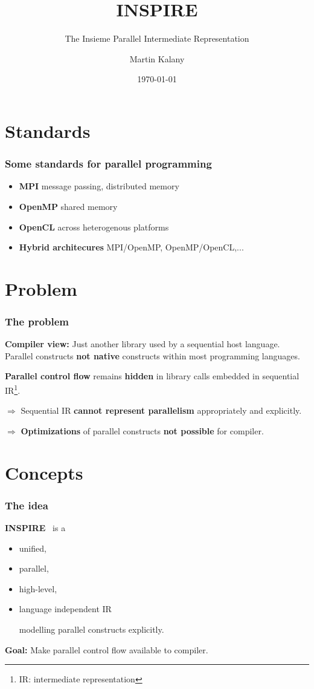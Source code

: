 \documentclass{beamer}
\title{INSPIRE}
\subtitle{The Insieme Parallel Intermediate Representation}
\author{Martin Kalany}
\institute
{
  Graduate student in Computer Science\\
  Vienna University of Technology\\
}
\date{\today}
\newcommand\fR[1]{\textcolor{red!80!black}{\textbf{#1}}}
\newcommand\fB[1]{\textcolor{blue!80!black}{\textbf{#1}}}
\newcommand\fG[1]{\textcolor{green!70!black}{\textbf{#1}}}
\begin{document}
\maketitle

\section{Standards}
\begin{frame}
\frametitle{Some standards for parallel programming}
\begin{itemize}
\item \fB{MPI} message passing, distributed memory
\item \fB{OpenMP} shared memory
\item \fB{OpenCL} across heterogenous platforms

\bigskip
\item \fB{Hybrid architecures} MPI/OpenMP, OpenMP/OpenCL,...
\end{itemize}
\end{frame}

\section{Problem}
\begin{frame}
\frametitle{The problem}

\fB{Compiler view:} Just another library used by a sequential host language. Parallel constructs \fR{not native} constructs within most programming languages.

\bigskip\pause
\fR{Parallel control flow} remains \fR{hidden} in library calls embedded in sequential IR\footnote{IR: intermediate representation}.

\bigskip\pause
$\Rightarrow$ Sequential IR \fR{cannot represent parallelism} appropriately and explicitly.

\bigskip\pause
$\Rightarrow$ \fR{Optimizations} of parallel constructs \fR{not possible} for compiler. 
\end{frame}

\section{Concepts}
\begin{frame}
\frametitle{The idea}
\fB{INSPIRE}~\cite{JordanPTKF13}  is a
\begin{itemize}
\item unified,
\item parallel,
\item high-level,
\item language independent IR

\smallskip
modelling parallel constructs explicitly.
\end{itemize}
\fG{Goal:} Make parallel control flow available to compiler.
\end{frame}
\end{document}
